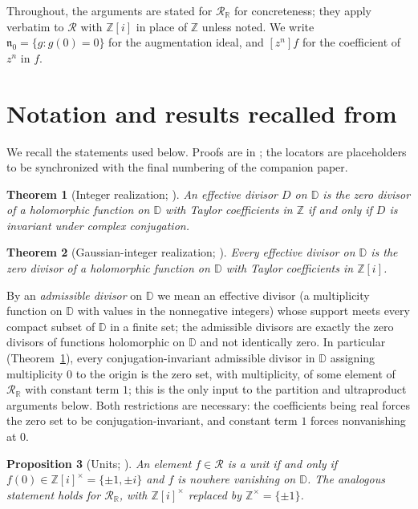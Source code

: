 \documentclass[12pt]{amsart}
\newtheorem{theorem}{Theorem}[section]
\newtheorem{proposition}[theorem]{Proposition}
\theoremstyle{definition}
\newcommand{\D}{\mathbb{D}}
\newcommand{\Z}{\mathbb{Z}}
\newcommand{\Zi}{\mathbb{Z}[i]}
\newcommand{\mR}{\mathcal{R}}
\newcommand{\mRR}{\mathcal{R}_{\mathbb{R}}}
\begin{document}
Throughout, the arguments are stated for $\mRR$ for concreteness; they
apply verbatim to $\mR$ with $\Zi$ in place of $\Z$ unless noted.  We
write $\mathfrak{n}_0 = \{g : g(0) = 0\}$ for the augmentation ideal, and
$[z^n]f$ for the coefficient of $z^n$ in $f$.

\section{Notation and results recalled from \cite{PaperI}}
\label{sec:recall}

We recall the statements used below.  Proofs are in \cite{PaperI}; the
locators are placeholders to be synchronized with the final numbering of
the companion paper.

\begin{theorem}[Integer realization; {\cite[Thm.~1.1]{PaperI}}]
\label{thm:main}
An effective divisor $D$ on $\D$ is the zero divisor of a holomorphic
function on $\D$ with Taylor coefficients in $\Z$ if and only if $D$ is
invariant under complex conjugation.
\end{theorem}

\begin{theorem}[Gaussian-integer realization; {\cite[Thm.~1.2]{PaperI}}]
\label{thm:Zi}
Every effective divisor on $\D$ is the zero divisor of a holomorphic
function on $\D$ with Taylor coefficients in $\Zi$.
\end{theorem}

By an \emph{admissible divisor} on $\D$ we mean an effective divisor
(a multiplicity function on $\D$ with values in the nonnegative
integers) whose support meets every compact subset of $\D$ in a finite
set; the admissible divisors are exactly the zero divisors of functions
holomorphic on $\D$ and not identically zero.  In particular
(Theorem~\ref{thm:main}), every conjugation-invariant admissible
divisor in $\D$ assigning multiplicity $0$ to the origin is
the zero set, with multiplicity, of some element of $\mRR$ with constant
term $1$; this is the only input to the partition and ultraproduct
arguments below.  Both restrictions are necessary: the coefficients being
real forces the zero set to be conjugation-invariant, and constant term
$1$ forces nonvanishing at $0$.

\begin{proposition}[Units; {\cite[Prop.~4.1]{PaperI}}]
\label{prop:units}
An element $f \in \mR$ is a unit if and only if $f(0) \in \Zi^\times =
\{\pm 1, \pm i\}$ and $f$ is nowhere vanishing on $\D$.  The analogous
statement holds for $\mRR$, with $\Zi^\times$ replaced by $\Z^\times =
\{\pm 1\}$.
\end{proposition}
\end{document}
